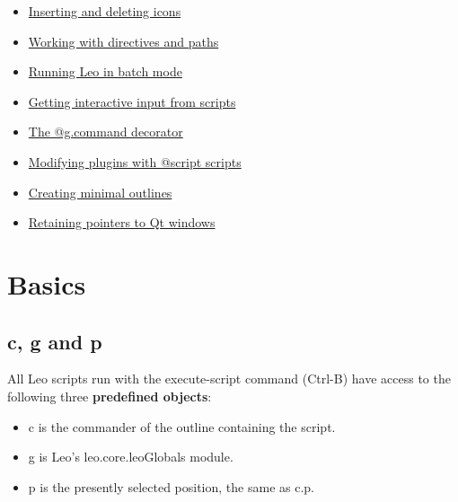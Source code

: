 \documentclass[a4paper,10pt,english]{sphinxmanual}
\begin{document}
{\begin{minipage}{0.95\linewidth}
\begin{itemize}
\begin{itemize}
\begin{itemize}
\item {} 
{\hyperref[scripting:inserting-and-deleting-icons]{Inserting and deleting icons}}

\item {} 
{\hyperref[scripting:working-with-directives-and-paths]{Working with directives and paths}}

\item {} 
{\hyperref[scripting:running-leo-in-batch-mode]{Running Leo in batch mode}}

\item {} 
{\hyperref[scripting:getting-interactive-input-from-scripts]{Getting interactive input from scripts}}

\item {} 
{\hyperref[scripting:the-g-command-decorator]{The @g.command decorator}}

\item {} 
{\hyperref[scripting:modifying-plugins-with-script-scripts]{Modifying plugins with @script scripts}}

\item {} 
{\hyperref[scripting:creating-minimal-outlines]{Creating minimal outlines}}

\item {} 
{\hyperref[scripting:retaining-pointers-to-qt-windows]{Retaining pointers to Qt windows}}

\end{itemize}

\end{itemize}

\end{itemize}
\end{minipage}}
\begin{center}\setlength{\fboxsep}{5pt}\end{center}


\section{Basics}
\label{scripting:basics}\label{scripting:rst3-plugin}

\subsection{c, g and p}
\label{scripting:c-g-and-p}
All Leo scripts run with the execute-script command (Ctrl-B)
have access to the following three \textbf{predefined objects}:
\begin{itemize}
\item {} 
c is the commander of the outline containing the script.

\item {} 
g is Leo's leo.core.leoGlobals module.

\item {} 
p is the presently selected position, the same as c.p.

\end{itemize}
\end{document}
